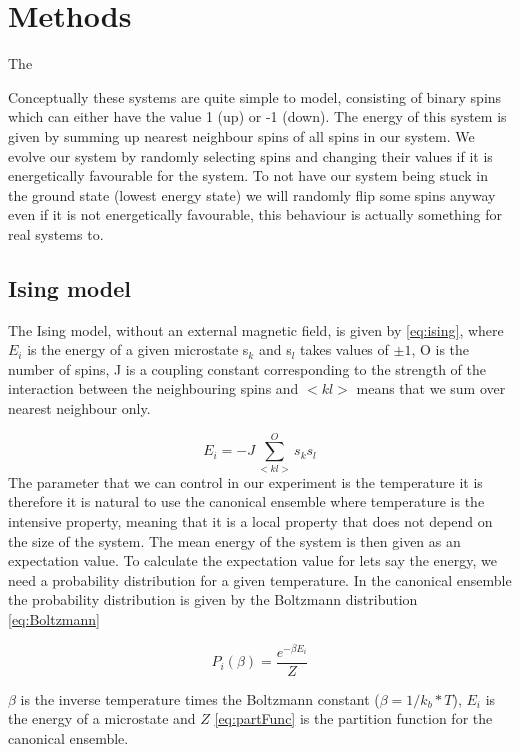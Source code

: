 \section{Methods}

The

Conceptually these systems are quite simple to model,
consisting of binary spins which can either have the value 1 (up) or -1 (down).
The energy of this system is given by summing up nearest neighbour spins of all
spins in our system. We evolve our system by randomly selecting spins and
changing their values if it is energetically favourable for the system. To not
have our system being stuck in the ground state (lowest energy state) we will randomly flip some spins
anyway even if it is not energetically favourable, this behaviour is actually
something for real systems to.
\subsection{Ising model}
The Ising model, without an external magnetic field, is given by
\cref{eq:ising}, where $E_i$ is the energy of a given microstate s$_k$ and s$_l$ takes values of $\pm 1$, O is the
number of spins, J is a coupling constant corresponding to the strength of the
interaction between the neighbouring spins and $<kl>$ means that we sum over
nearest neighbour only.

\begin{equation}\label{eq:ising}
  E_i = -J\sum_{<kl>}^{O} s_k s_l
\end{equation}
The parameter that we can control in our experiment is the temperature it is
therefore it is natural to
use the canonical ensemble where temperature is the intensive property, meaning
that it is a local property that does not depend on the size of the system. The
mean energy of the system is then given as an expectation value. To calculate
the expectation value for lets say the energy, we need a probability distribution
for a given temperature. In the canonical ensemble the probability distribution
is given by the Boltzmann distribution \cref{eq:Boltzmann}

\begin{equation}\label{eq:Boltzmann}
  P_i(\beta) = \frac{e^{-\beta E_i}}{Z}
\end{equation}

$\beta$ is the inverse temperature times the Boltzmann constant
($\beta = 1/k_b*T $),  $E_i$ is the energy of a microstate and $Z$
\cref{eq:partFunc} is the partition function for the canonical ensemble.

